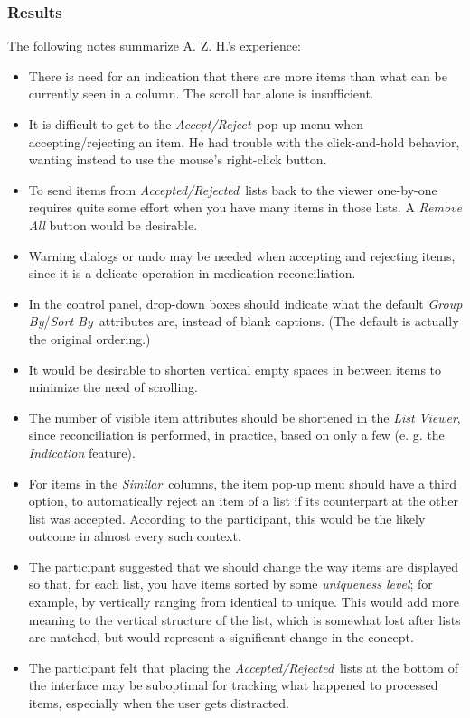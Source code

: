 \documentclass{chi2009}
\newcommand{\ListViewer}{\textit{List Viewer}}
\newcommand{\AcceptReject}{\textit{Accept/Reject}}
\newcommand{\AcceptedRejected}{\textit{Accepted/Rejected}}
\newcommand{\GroupBy}{\textit{Group By}}
\newcommand{\SortBy}{\textit{Sort By}}
\newcommand{\Similar}{\textit{Similar}}
\begin{document}
\subsubsection{Results}
The following notes summarize A. Z. H.'s experience:
\begin{itemize}
\item There is need for an indication that there are more items than what can be currently seen in a column. The scroll bar alone is insufficient.
\item It is difficult to get to the \AcceptReject~pop-up menu when accepting/rejecting an item. He had trouble with the click-and-hold behavior, wanting instead to use the mouse's right-click button.
\item To send items from \AcceptedRejected~lists back to the viewer one-by-one requires quite some effort when you have many items in those lists. A \textit{Remove All} button would be desirable.
\item Warning dialogs or undo may be needed when accepting and rejecting items, since it is a delicate operation in medication reconciliation.
\item In the control panel, drop-down boxes should indicate what the default \GroupBy/\SortBy~attributes are, instead of blank captions. (The default is actually the original ordering.)
\item It would be desirable to shorten vertical empty spaces in between items to minimize the need of scrolling.
\item The number of visible item attributes should be shortened in the \ListViewer, since reconciliation is performed, in practice, based on only a few (e. g. the \textit{Indication} feature).
\item For items in the \Similar~columns, the item pop-up menu should have a third option, to automatically reject an item of a list if its counterpart at the other list was accepted. According to the participant, this would be the likely outcome in almost every such context.
\item The participant suggested that we should change the way items are displayed so that, for each list, you have items sorted by some \textit{uniqueness level}; for example, by vertically ranging from identical to unique. This would add more meaning to the vertical structure of the list, which is somewhat lost after lists are matched, but would represent a significant change in the concept.
\item The participant felt that placing the \AcceptedRejected~lists at the bottom of the interface may be suboptimal for tracking what happened to processed items, especially when the user gets distracted.

\end{itemize}
\end{document}
